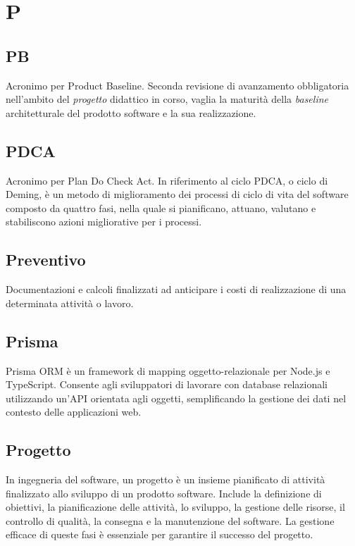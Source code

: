 \chapter{P}

\section{PB}\label{sec:Product Baseline}
Acronimo per Product Baseline. Seconda revisione di avanzamento obbligatoria nell'ambito del \emph{progetto} didattico in corso, vaglia la maturità della \emph{baseline} architetturale del prodotto software e la sua realizzazione.

\section{PDCA}\label{sec:Plan Do Check Act}
Acronimo per Plan Do Check Act. In riferimento al ciclo PDCA, o ciclo di Deming, è un metodo di miglioramento dei processi di ciclo di vita del software composto da quattro fasi, nella quale si pianificano, attuano, valutano e stabiliscono azioni migliorative per i processi.

\section{Preventivo}\label{sec:Preventivi}
Documentazioni e calcoli finalizzati ad anticipare i costi di realizzazione di una determinata attività o lavoro.

\section{Prisma}
Prisma ORM è un framework di mapping oggetto-relazionale per Node.js e TypeScript. Consente agli sviluppatori di lavorare con database relazionali utilizzando un'API orientata agli oggetti, semplificando la gestione dei dati nel contesto delle applicazioni web.

\section{Progetto}\label{sec:Progetti}
In ingegneria del software, un progetto è un insieme pianificato di attività finalizzato allo sviluppo di un prodotto software. Include la definizione di obiettivi, la pianificazione delle attività, lo sviluppo, la gestione delle risorse, il controllo di qualità, la consegna e la manutenzione del software. La gestione efficace di queste fasi è essenziale per garantire il successo del progetto.

